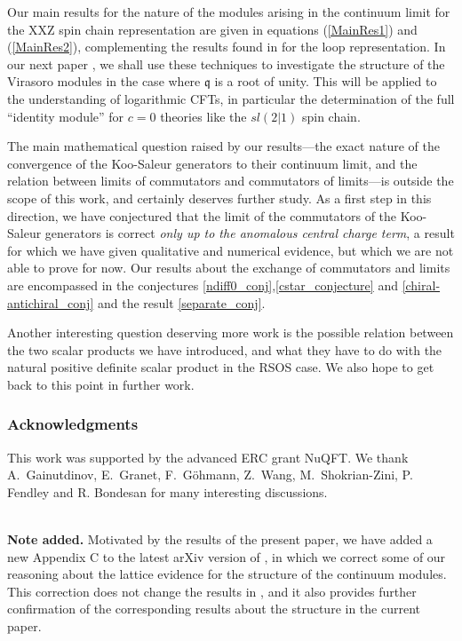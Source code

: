 \documentclass[a4paper,10pt]{article}
\newcommand{\q}{\mathfrak{q}}
\begin{document}
Our main results for the nature of the modules arising in the continuum limit for the XXZ spin chain representation are given in equations (\ref{MainRes1}) and (\ref{MainRes2}), complementing the results found in \cite{LoopPaper} for the loop representation. %
%
In our next paper \cite{fullynongenericpaper}, we shall use these techniques to investigate the structure of the Virasoro modules in the case where $\q$ is a root of unity. This will be applied to the understanding of logarithmic CFTs, in particular the determination of  the full ``identity module'' for $c=0$ theories like the $sl(2|1)$ spin chain. 

The main mathematical question raised by our results---the exact nature of the convergence of the Koo-Saleur generators to their continuum limit, and the relation between limits of commutators and commutators of limits---is outside the scope of this work, and certainly deserves further study. As a first step in this direction, we have conjectured that the limit of the commutators of the Koo-Saleur generators is correct {\sl only up to the anomalous central charge term}, a result for which we have given qualitative and numerical evidence, but which we are not able to prove for now. Our results about the exchange of commutators and limits are encompassed in the conjectures \eqref{ndiff0_conj},\eqref{cstar_conjecture} and \eqref{chiral-antichiral_conj} and the result  \eqref{separate_conj}.

Another interesting question deserving more work is the possible relation between the two scalar products we have introduced, and what they have to do with the natural positive definite scalar product in the RSOS case. We also hope to get back to this point in further work.

\subsubsection*{Acknowledgments}
This work was supported by the advanced ERC grant NuQFT. We thank A.~Gainutdinov, E.~Granet, F.~G\"ohmann, Z.~Wang, M.~Shokrian-Zini, P. Fendley and R. Bondesan for many interesting discussions.

~\\
\textbf{Note added.} Motivated by the results of the present paper, we have added a new Appendix C to the latest arXiv version of \cite{LoopPaper}, in which we correct some of our reasoning about the lattice evidence for the structure of the continuum modules. This correction does not change the results in \cite{LoopPaper}, and it also provides further confirmation of the corresponding results about the structure in the current paper.
\end{document}
